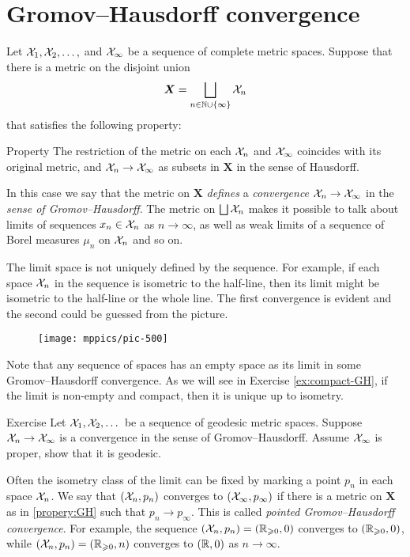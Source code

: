 \section{Gromov--Hausdorff convergence}\label{sec:Gromov--Hausdorff}

Let $\mathcal{X}_1,\mathcal{X}_2,\dots,$ and $\mathcal{X}_\infty$ be a sequence of complete metric spaces.
Suppose that there is a metric on the disjoint union 
\[\bm{X}=\bigsqcup_{n\in \mathbb{N}\cup\{\infty\}} \mathcal{X}_n\] 
that satisfies the following property:

\begin{thm}{Property}\label{propery:GH}
The restriction of the metric on each $\mathcal{X}_n$ and $\mathcal{X}_\infty$ coincides with its original metric, 
and $\mathcal{X}_n\to \mathcal{X}_\infty$ as subsets in $\bm{X}$ in the sense of Hausdorff.
\end{thm}

In this case we say that the metric on $\bm{X}$ \textit{defines} a \emph{convergence} $\mathcal{X}_n\to \mathcal{X}_\infty$ in the {}\emph{sense of Gromov--Hausdorff}.
The metric on  $\bigsqcup \mathcal{X}_n$ makes it possible to talk about limits of sequences $x_n\in \mathcal{X}_n$ as $n\to\infty$, as well as weak limits of a sequence of Borel measures $\mu_n$ on $\mathcal{X}_n$ and so on.

The limit space is not uniquely defined by the sequence.
For example, if each space $\mathcal{X}_n$ in the sequence is isometric to the half-line, then its limit might be isometric to the half-line or the whole line.
The first convergence is evident and the second could be guessed from the picture.

\begin{figure}[ht!]
\vskip-0mm
\centering
\texttt{[image: mppics/pic-500]}
\end{figure}

Note that any sequence of spaces has an empty space as its limit in some  Gromov--Hausdorff convergence.
As we will see in Exercise \ref{ex:compact-GH}, if the limit is non-empty and compact, then it is unique up to isometry.

\begin{thm}{Exercise}\label{ex:geod-closed}
Let $\mathcal{X}_1,\mathcal{X}_2,\dots$ be a sequence of geodesic metric spaces.
Suppose $\mathcal{X}_n\to \mathcal{X}_\infty$ is a convergence in the sense of Gromov--Hausdorff.
Assume $\mathcal{X}_\infty$ is proper, show that it is geodesic.
\end{thm}

Often the isometry class of the limit can be fixed by marking a point $p_n$ in each space $\mathcal{X}_n$.
We say that $(\mathcal{X}_n,p_n)$ converges to $(\mathcal{X}_\infty,p_\infty)$ if there is a metric on $\bm{X}$ as in \ref{propery:GH} such that $p_n\to p_\infty$.
This is called \emph{pointed Gromov--Hausdorff convergence}.
For example, the sequence $(\mathcal{X}_n,p_n)=(\mathbb{R}_{\geqslant0},0)$ converges to $(\mathbb{R}_{\geqslant0},0)$, while $(\mathcal{X}_n,p_n)=(\mathbb{R}_{\geqslant0},n)$ converges to $(\mathbb{R},0)$ as $n\to \infty$.

